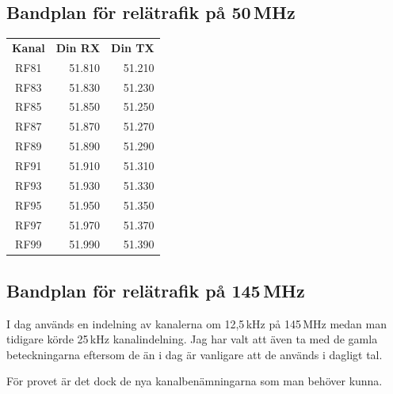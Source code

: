 \subsection{Bandplan för relätrafik på 50\,MHz}

\begin{tabular}{crr}
	\textbf{Kanal} & \textbf{Din RX} & \textbf{Din TX} \\
	     RF81      &    \num{51,810} &    \num{51,210} \\
	     RF83      &    \num{51,830} &    \num{51,230} \\
	     RF85      &    \num{51,850} &    \num{51,250} \\
	     RF87      &    \num{51,870} &    \num{51,270} \\
	     RF89      &    \num{51,890} &    \num{51,290} \\
	     RF91      &    \num{51,910} &    \num{51,310} \\
	     RF93      &    \num{51,930} &    \num{51,330} \\
	     RF95      &    \num{51,950} &    \num{51,350} \\
	     RF97      &    \num{51,970} &    \num{51,370} \\
	     RF99      &    \num{51,990} &    \num{51,390}
\end{tabular}
	
\subsection{Bandplan för relätrafik på 145\,MHz}

I dag används en indelning av kanalerna om 12,5\,kHz på 145\,MHz medan man tidigare körde 25\,kHz kanalindelning. Jag har valt att även ta med de gamla beteckningarna eftersom de än i dag är vanligare att de används i dagligt tal.

För provet är det dock de nya kanalbenämningarna som man behöver kunna.

